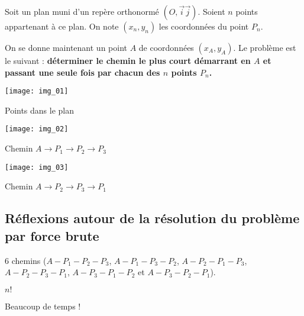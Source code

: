 
\ifprof
\else

Soit un plan muni d'un repère orthonormé $\left(O,\overrightarrow{i}\overrightarrow{j}\right)$. Soient $n$ points appartenant à ce plan. 
On note $(x_n,y_n)$ les coordonnées du point $P_n$. 

On se donne maintenant un point $A$ de coordonnées $(x_A,y_A)$. Le problème est le suivant : \textbf{déterminer le chemin le plus court démarrant en $A$ et passant une seule fois par chacun des $n$ points $P_n$.}

\begin{multicols}{3}
\begin{center}
\texttt{[image: img\_01]}

Points dans le plan
\end{center}

\begin{center}
\texttt{[image: img\_02]}

Chemin $A\to P_1 \to P_2 \to P_3$
\end{center}

\begin{center}
\texttt{[image: img\_03]}

Chemin $A\to P_2 \to P_3 \to P_1$
\end{center}
\end{multicols}
\fi

\subsection*{Réflexions autour de la résolution du problème par force brute}

\ifprof
\begin{corrige}
6 chemins ($A-P_1-P_2-P_3$, $A-P_1-P_3-P_2$, $A-P_2-P_1-P_3$, $A-P_2-P_3-P_1$, $A-P_3-P_1-P_2$ et $A-P_3-P_2-P_1$).
\end{corrige}
\else
\fi

\ifprof
\begin{corrige}
$n!$
\end{corrige}
\else
\fi

\ifprof
\begin{corrige}
Beaucoup de temps !
\end{corrige}
\else
\fi



